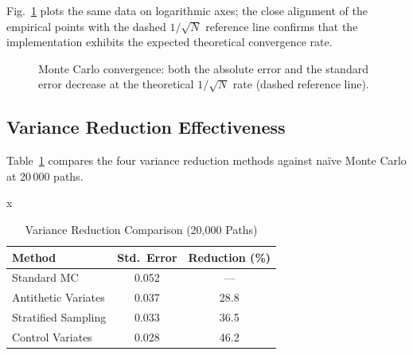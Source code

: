 \documentclass[conference]{IEEEtran}
\begin{document}
Fig.~\ref{fig:mc_convergence} plots the same data on logarithmic axes; the close alignment of the empirical points with the dashed $1/\sqrt{N}$ reference line confirms that the implementation exhibits the expected theoretical convergence rate.

\begin{figure}[htbp]
\centering
{}
\caption{Monte Carlo convergence: both the absolute error and the standard error decrease at the theoretical $1/\sqrt{N}$ rate (dashed reference line).}
\label{fig:mc_convergence}
\end{figure}

\subsection{Variance Reduction Effectiveness}

Table~\ref{tab:variance_reduction} compares the four variance reduction methods against na\"ive Monte Carlo at 20\,000 paths.

\begin{table}[htbp]
\caption{Variance Reduction Comparison (20,000 Paths)}
\label{tab:variance_reduction}
\centering
\small
\setlength{\tabcolsep}{5pt}x
\renewcommand{\arraystretch}{1.05}
\begin{tabular}{lcc}
\toprule
\textbf{Method} & \textbf{Std.\ Error} & \textbf{Reduction (\%)} \\
\midrule
Standard MC & 0.052 & --- \\
Antithetic Variates & 0.037 & 28.8 \\
Stratified Sampling & 0.033 & 36.5 \\
Control Variates & 0.028 & 46.2 \\
\bottomrule
\end{tabular}
\end{table}
\end{document}
